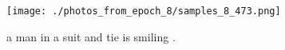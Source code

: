 \documentclass{article}%
\begin{document}
%


\begin{figure}[h!]%
\centering%
\texttt{[image: ./photos\_from\_epoch\_8/samples\_8\_473.png]}%
\caption{a man in a suit and tie is smiling .}%
\end{figure}

%
\end{document}
